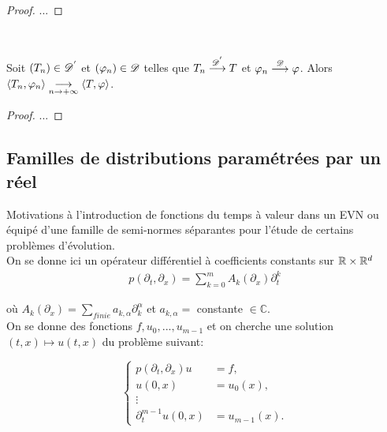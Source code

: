 \documentclass[french,a4paper,10pt]{article}
\begin{document}
            \begin{proof}
                ...
            \end{proof}
    
            \begin{corollaire}\label{corol:2.1.6}~
            
                Soit $(T_n) \in \mathscr{D^{'}}$ et $(\varphi_n) \in \mathscr{D}$ telles que $T_n \stackrel{\mathscr{D^{'}}}{\longrightarrow}T$ et $\varphi_n \stackrel{\mathscr{D}}{\longrightarrow}\varphi$. Alors $\langle T_n,\varphi_n\rangle \underset{n \to +\infty}{\longrightarrow} \langle T,\varphi \rangle$.
            \end{corollaire}
    
            \begin{proof}
                ...
            \end{proof}

        \subsection{Familles de distributions paramétrées par un réel}\label{subsec:2.2}
            Motivations à l'introduction de fonctions du temps à valeur dans un EVN ou équipé d'une famille de semi-normes séparantes pour l'étude de certains problèmes d'évolution. \\[3mm]
            On se donne ici un opérateur différentiel à coefficients constants sur $\mathbb{R} \times \mathbb{R}^d$
            \begin{equation*}
                \begin{aligned}
                    p(\partial_t,\partial_x) = \sum_{k=0}^{m} A_k(\partial_x)\partial_t^k
                \end{aligned}
            \end{equation*}
            
            où $A_k(\partial_x) = \sum_{finie}a_{k,\alpha}\partial_k^{\alpha}$ et $a_{k,\alpha} =$ constante $\in \mathbb{C}$. \\
    
            On se donne des fonctions $f,u_0,...,u_{m-1}$ et on cherche une solution $(t,x) \longmapsto u(t,x)$ du problème suivant:

            \begin{equation}
                \begin{cases}
                    p(\partial_t,\partial_x)u &= f,\\
                    u(0,x) &= u_0(x),\\
                    \vdots & \\
                    \partial_t^{m-1}u(0,x) &= u_{m-1}(x).
                \end{cases}\label{eq:3}
            \end{equation}
\end{document}
